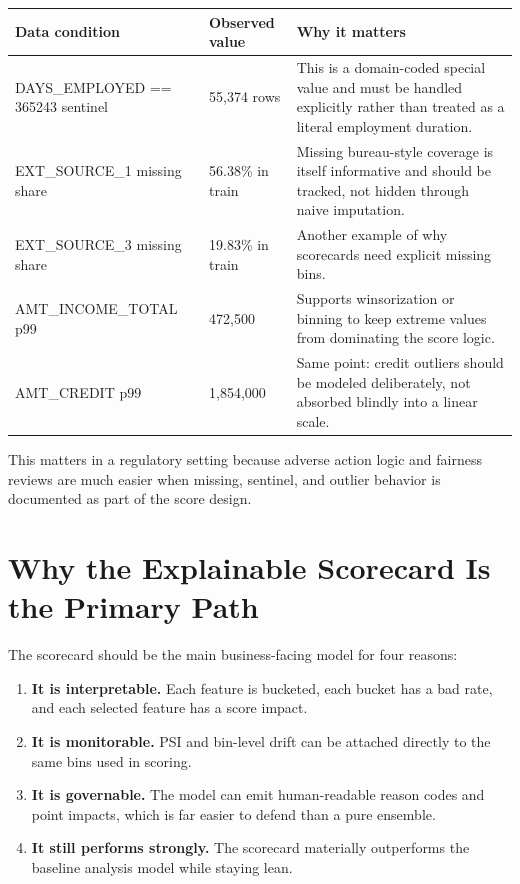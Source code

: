 \documentclass[11pt]{article}
\begin{document}
{\small
\begin{tabularx}{\textwidth}{@{}P{0.30\textwidth}P{0.15\textwidth}Y@{}}
\toprule
Data condition & Observed value & Why it matters \\
\midrule
DAYS\_EMPLOYED == 365243 sentinel & 55{,}374 rows & This is a domain-coded special value and must be handled explicitly rather than treated as a literal employment duration. \\
EXT\_SOURCE\_1 missing share & 56.38\% in train & Missing bureau-style coverage is itself informative and should be tracked, not hidden through naive imputation. \\
EXT\_SOURCE\_3 missing share & 19.83\% in train & Another example of why scorecards need explicit missing bins. \\
AMT\_INCOME\_TOTAL p99 & 472{,}500 & Supports winsorization or binning to keep extreme values from dominating the score logic. \\
AMT\_CREDIT p99 & 1{,}854{,}000 & Same point: credit outliers should be modeled deliberately, not absorbed blindly into a linear scale. \\
\bottomrule
\end{tabularx}
}

This matters in a regulatory setting because adverse action logic and fairness reviews are much easier when missing, sentinel, and outlier behavior is documented as part of the score design.

\section{Why the Explainable Scorecard Is the Primary Path}

The scorecard should be the main business-facing model for four reasons:

\begin{enumerate}
  \item \textbf{It is interpretable.} Each feature is bucketed, each bucket has a bad rate, and each selected feature has a score impact.
  \item \textbf{It is monitorable.} PSI and bin-level drift can be attached directly to the same bins used in scoring.
  \item \textbf{It is governable.} The model can emit human-readable reason codes and point impacts, which is far easier to defend than a pure ensemble.
  \item \textbf{It still performs strongly.} The scorecard materially outperforms the baseline analysis model while staying lean.
\end{enumerate}
\end{document}
